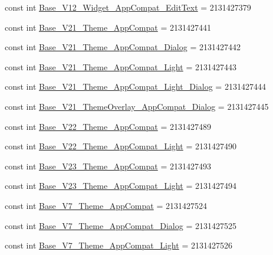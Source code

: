 \begin{CompactItemize}
\item 
const int \hyperlink{class__2doo_1_1_droid_1_1_resource_1_1_style_c4aedba5358ac4a1656040556a0e530a}{Base\_\-V12\_\-Widget\_\-AppCompat\_\-EditText} = 2131427379
\item 
const int \hyperlink{class__2doo_1_1_droid_1_1_resource_1_1_style_eb72470a5b8537679e1cc2ce5dd48a0c}{Base\_\-V21\_\-Theme\_\-AppCompat} = 2131427441
\item 
const int \hyperlink{class__2doo_1_1_droid_1_1_resource_1_1_style_0134f3c9822ab32b63f4d130824e68f9}{Base\_\-V21\_\-Theme\_\-AppCompat\_\-Dialog} = 2131427442
\item 
const int \hyperlink{class__2doo_1_1_droid_1_1_resource_1_1_style_c966eb8b1b85db728a5d0b677fe7a161}{Base\_\-V21\_\-Theme\_\-AppCompat\_\-Light} = 2131427443
\item 
const int \hyperlink{class__2doo_1_1_droid_1_1_resource_1_1_style_d72e15828b3373f6585e2ff26b8a3720}{Base\_\-V21\_\-Theme\_\-AppCompat\_\-Light\_\-Dialog} = 2131427444
\item 
const int \hyperlink{class__2doo_1_1_droid_1_1_resource_1_1_style_cbba7c91c8f520fb364697f25f00f4af}{Base\_\-V21\_\-ThemeOverlay\_\-AppCompat\_\-Dialog} = 2131427445
\item 
const int \hyperlink{class__2doo_1_1_droid_1_1_resource_1_1_style_661ebcf3d56295e184112635ac4f0ed9}{Base\_\-V22\_\-Theme\_\-AppCompat} = 2131427489
\item 
const int \hyperlink{class__2doo_1_1_droid_1_1_resource_1_1_style_6e84a61f8aa07effc5b12877e4c410e4}{Base\_\-V22\_\-Theme\_\-AppCompat\_\-Light} = 2131427490
\item 
const int \hyperlink{class__2doo_1_1_droid_1_1_resource_1_1_style_e751d491be132b949028b45a9c1423e5}{Base\_\-V23\_\-Theme\_\-AppCompat} = 2131427493
\item 
const int \hyperlink{class__2doo_1_1_droid_1_1_resource_1_1_style_1d901a164733d4cbd5dbc72384e29e64}{Base\_\-V23\_\-Theme\_\-AppCompat\_\-Light} = 2131427494
\item 
const int \hyperlink{class__2doo_1_1_droid_1_1_resource_1_1_style_0514e4f5c40dc0e17b5bc13338bec994}{Base\_\-V7\_\-Theme\_\-AppCompat} = 2131427524
\item 
const int \hyperlink{class__2doo_1_1_droid_1_1_resource_1_1_style_a765e5ba4cbd8597d2e41c34c4c0dc62}{Base\_\-V7\_\-Theme\_\-AppCompat\_\-Dialog} = 2131427525
\item 
const int \hyperlink{class__2doo_1_1_droid_1_1_resource_1_1_style_226eeb99bfd41828e2bbe524b214e99a}{Base\_\-V7\_\-Theme\_\-AppCompat\_\-Light} = 2131427526

\end{CompactItemize}
